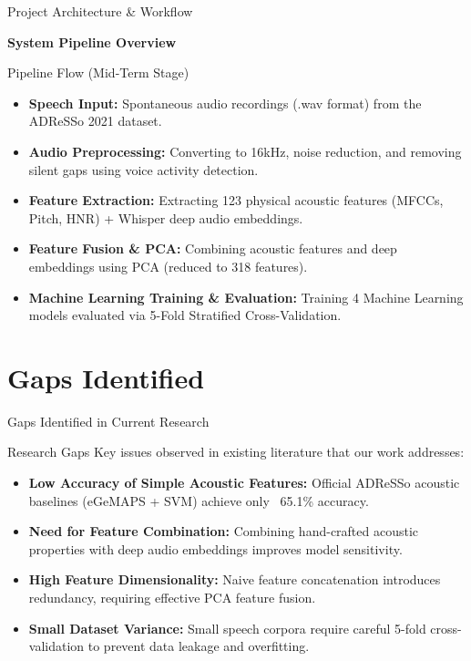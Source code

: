 \documentclass[aspectratio=169]{beamer}
\begin{document}
\begin{frame}{Project Architecture \& Workflow}
    \begin{center}
        \textbf{\Large System Pipeline Overview}
    \end{center}
    \vfill
    \begin{block}{Pipeline Flow (Mid-Term Stage)}
    \begin{itemize}
        \item \textbf{Speech Input:} Spontaneous audio recordings (.wav format) from the ADReSSo 2021 dataset.
        \item \textbf{Audio Preprocessing:} Converting to 16kHz, noise reduction, and removing silent gaps using voice activity detection.
        \item \textbf{Feature Extraction:} Extracting 123 physical acoustic features (MFCCs, Pitch, HNR) + Whisper deep audio embeddings.
        \item \textbf{Feature Fusion \& PCA:} Combining acoustic features and deep embeddings using PCA (reduced to 318 features).
        \item \textbf{Machine Learning Training \& Evaluation:} Training 4 Machine Learning models evaluated via 5-Fold Stratified Cross-Validation.
    \end{itemize}
    \end{block}
\end{frame}

\section{Gaps Identified}
\begin{frame}{Gaps Identified in Current Research}
    \begin{alertblock}{Research Gaps}
        Key issues observed in existing literature that our work addresses:
    \end{alertblock}
    \begin{itemize}
        \item \textbf{Low Accuracy of Simple Acoustic Features:} Official ADReSSo acoustic baselines (eGeMAPS + SVM) achieve only ~65.1\% accuracy.
        \item \textbf{Need for Feature Combination:} Combining hand-crafted acoustic properties with deep audio embeddings improves model sensitivity.
        \item \textbf{High Feature Dimensionality:} Naive feature concatenation introduces redundancy, requiring effective PCA feature fusion.
        \item \textbf{Small Dataset Variance:} Small speech corpora require careful 5-fold cross-validation to prevent data leakage and overfitting.
    \end{itemize}
\end{frame}
\end{document}
